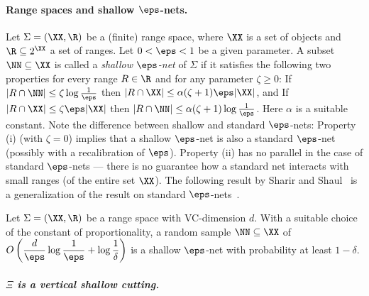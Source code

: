 \paragraph{Range spaces and shallow $\eps$-nets.}
\fi
%
Let $\Sigma=(\XX,\R)$ be a (finite) range space, where $\XX$ is a set of objects and $\R \subseteq 2^\XX$ a set of ranges.
Let $0 < \eps < 1$ be a given parameter. A subset $\NN \subseteq \XX$ is called 
a \emph{shallow $\eps$-net} of $\Sigma$ if it satisfies the following two properties
for every range $R \in \R$ and for any parameter $\zeta \ge 0$:
%
\medskip
{}
If $|R\cap \NN| \le \zeta \log \frac{1}{\eps}$ then $|R\cap \XX| \le \alpha(\zeta + 1)\eps|\XX|$, and
%
\medskip
{}
If $|R\cap \XX| \le \zeta\eps|\XX|$ then $|R\cap \NN| \le \alpha(\zeta + 1) \log \frac{1}{\eps}$. 
%
\medskip
Here $\alpha$ is a suitable constant.
Note the difference between shallow and standard $\eps$-nets: Property (i) (with $\zeta = 0$) implies that
a shallow $\eps$-net is also a standard $\eps$-net (possibly with a recalibration of $\eps$). 
Property (ii) has no parallel in the case of standard $\eps$-nets --- there is no guarantee how 
a standard net interacts with small ranges (of the entire set $\XX$). The following result by 
Sharir and Shaul~\cite{ShSh} is a generalization of the result on standard $\eps$-nets~\cite{HW87}.
%
\begin{lemma}
	\label{lem:shallow-net}
Let $\Sigma=(\XX,\R)$ be a range space with VC-dimension $d$.
With a suitable choice of the constant of proportionality, a random sample $\NN \subseteq \XX$ of
${\displaystyle O\left(\frac{d}{\eps}\log\frac{1}{\eps} + \log\frac{1}{\delta}\right)}$
is a shallow $\eps$-net with probability at least $1 - \delta$.
\end{lemma}
%
\ifsocgproc 
\subparagraph*{$\Xi$ is a vertical shallow cutting.}
\else
